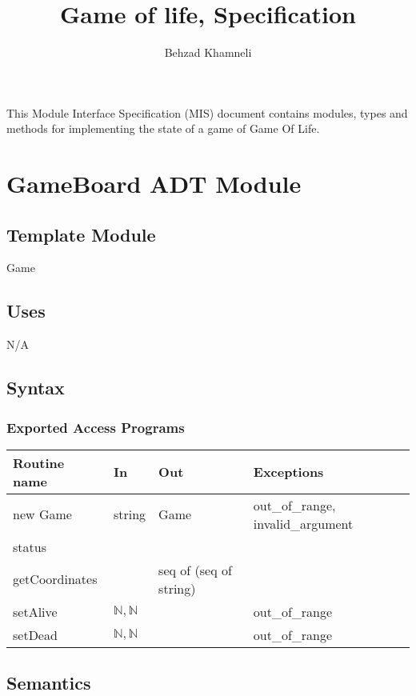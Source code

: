 \documentclass[12pt]{article}
\title{Game of life, Specification}
\author{Behzad Khamneli}
\date{}
\begin{document}
\maketitle
This Module Interface Specification (MIS) document contains modules, types and
methods for implementing the state of a game of Game Of Life.




\newpage

\section* {GameBoard ADT Module}

\subsection*{Template Module}

Game

\subsection* {Uses}

N/A

\subsection* {Syntax}

\subsubsection* {Exported Access Programs}

\begin{tabular}{| l | l | l | l |}
\hline
\textbf{Routine name} & \textbf{In} & \textbf{Out} & \textbf{Exceptions}\\
\hline
new Game  & string & Game & out\_of\_range, invalid\_argument\\
\hline
status &&&\\
\hline
getCoordinates &  & seq of (seq of string) & \\
\hline
setAlive & $\mathbb{N}, \mathbb{N}$ & & out\_of\_range \\
\hline
setDead & $\mathbb{N}, \mathbb{N}$ & & out\_of\_range \\
\hline

\end{tabular}

\subsection* {Semantics}
\end{document}
